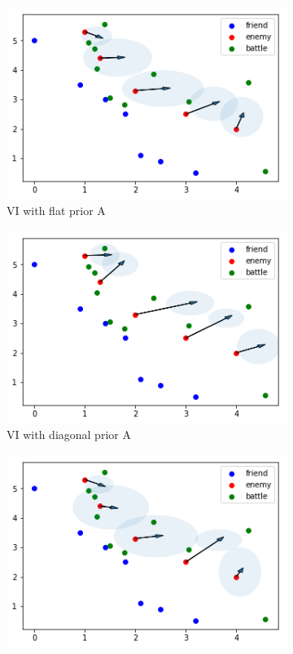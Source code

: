 \documentclass{article}
\begin{document}
\begin{figure}[h]
  \begin{subfigure}[b]{0.45\linewidth}
    \includegraphics[width=\linewidth]{VI11.png}
    \caption{VI with flat prior A}
  \end{subfigure}
  \begin{subfigure}[b]{0.45\linewidth}
    \includegraphics[width=\linewidth]{VI12.png}
    \caption{VI with diagonal prior A}
  \end{subfigure}
  \begin{subfigure}[b]{0.45\linewidth}
    \includegraphics[width=\linewidth]{VI21.png}

\end{subfigure}
\end{figure}
\end{document}
